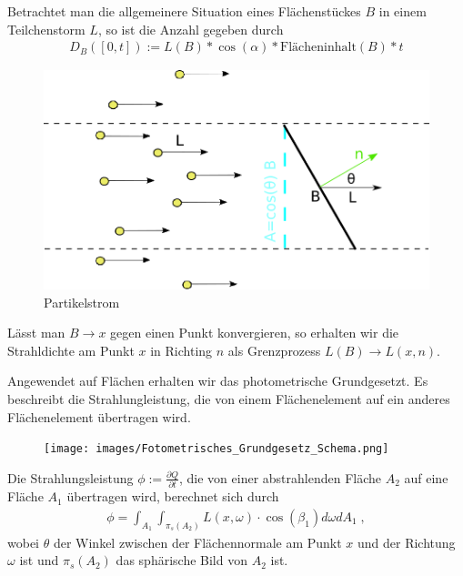  Betrachtet man die allgemeinere Situation eines Flächenstückes $B$  in einem Teilchenstorm $L$, so ist die Anzahl gegeben durch 
\begin{align}
D_B([0,t]) :=L(B) * \cos(\alpha) *  \text{Flächeninhalt} (B) * t
 \end{align}
\begin{figure}[H]
    \centering
    \includegraphics[width=1.0\textwidth]{images/Strahldichte.png}
    \caption{Partikelstrom}
    \label{fig:cray}
\end{figure}

Lässt man $B \to x$ gegen einen Punkt konvergieren, so erhalten wir die Strahldichte  am Punkt $x$ in Richting $n$ als Grenzprozess  $L(B) \to L(x, n)$.


Angewendet  auf Flächen erhalten wir das  photometrische Grundgesetzt. Es beschreibt die Strahlungleistung, die von einem  Flächenelement auf ein anderes  Flächenelement übertragen wird.

   \begin{figure}[H] 
    \centering
  
    \texttt{[image: images/Fotometrisches\_Grundgesetz\_Schema.png]}
    \label{fig:shadowmap1}
      \end{figure}
  


\begin{Satz}
Die Strahlungsleistung $\phi:= \frac{ \partial Q}{\partial t}$, die von einer abstrahlenden Fläche $A_2$  auf eine Fläche $A_1$ übertragen wird, berechnet sich durch
\begin{align}
\phi = \int_{A_1} \int_{\pi_s(A_2)} L(x, \omega)\cdot \cos(\beta_1) d\omega  dA_1   \; ,
\end{align}
wobei $\theta$ der Winkel zwischen der Flächennormale am Punkt $x$ und der Richtung $\omega$ ist und $\pi_s(A_2)$ das sphärische Bild von $A_2$ ist.
\end{Satz}

